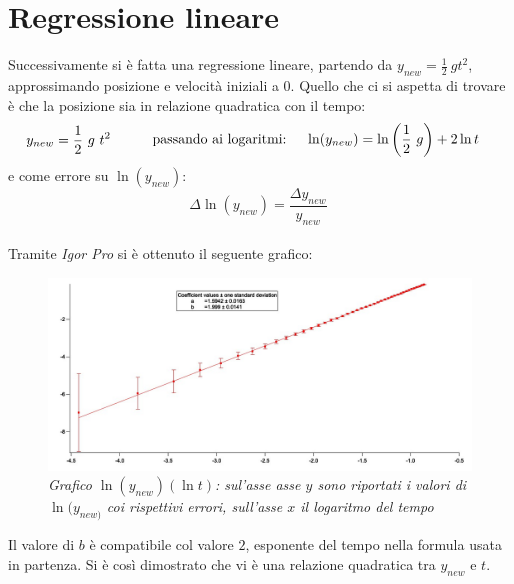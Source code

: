 \documentclass[12pt, a4paper]{article}
\begin{document}
\section{Regressione lineare}
Successivamente si è fatta una regressione lineare, partendo da $y_{new}= \frac{1}{2}\ g t^2$, approssimando posizione e velocità iniziali a $0$. Quello che ci si aspetta di trovare è che la posizione sia in relazione quadratica con il tempo:
\begin{equation*}
\begin{aligned}
  & y_{new}= \frac{1}{2}\ g\ t^2
  &\quad{} 
  \end{aligned}
  \begin{aligned}
  &&\text{passando ai logaritmi:\phantom{..}}& & \ln(y_{new})=\ln\left({\frac{1}{2}\ g}\right) +2\ln{t}
  &
  \end{aligned}
\end{equation*}
e come errore su $\ln({y_{new}})$: 
\begin{equation*}
    \Delta\ln{(y_{new})}=\frac{\Delta y_{new}}{y_{new}}\ 
\end{equation*}\\
 Tramite \textit{Igor Pro} si è ottenuto il seguente grafico:\\
   \begin{figure}[h!]
\centering
\includegraphics[width=170mm]{Immagini/GraphLn.jpg}
\caption{\textit{{\footnotesize{Grafico $\ln{(y_{new})}(\ln{t})$: sul'asse asse $y$ sono riportati i valori di $\ln{(y_{new)}}$ coi rispettivi errori, sull'asse $x$ il logaritmo del tempo}}}}
\label{Grafico logaritmico}
\end{figure}

Il valore di $b$ è compatibile col valore $2$, esponente del tempo nella formula usata in partenza.  Si è così dimostrato che vi è una relazione quadratica tra $y_{new}$ e $t$.
\end{document}
